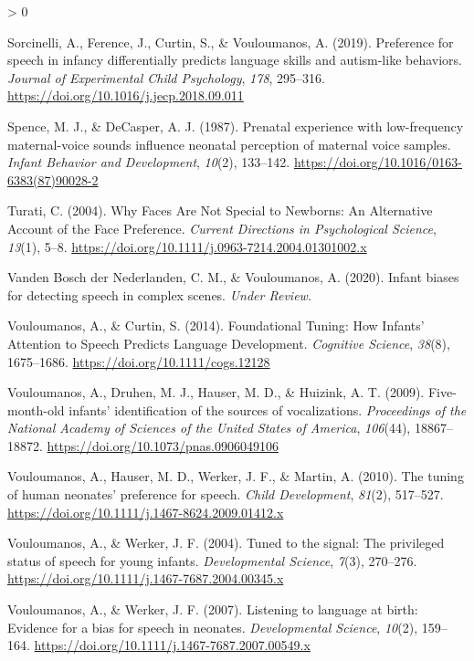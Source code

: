 \documentclass[
  english,
  man]{apa6}
\newlength{\cslhangindent}
\newenvironment{CSLReferences}[2] %
 {%
  \setlength{\parindent}{0pt}
  \ifodd #1 \everypar{\setlength{\hangindent}{\cslhangindent}}\ignorespaces\fi
  \ifnum #2 > 0
  \setlength{\parskip}{#2\baselineskip}
  \fi
 }%
 {}
\begin{document}
\begin{CSLReferences}{1}{0}
\leavevmode\hypertarget{ref-sorcinelli_preference_2019}{}%
Sorcinelli, A., Ference, J., Curtin, S., \& Vouloumanos, A. (2019). Preference for speech in infancy differentially predicts language skills and autism-like behaviors. \emph{Journal of Experimental Child Psychology}, \emph{178}, 295--316. \url{https://doi.org/10.1016/j.jecp.2018.09.011}

\leavevmode\hypertarget{ref-spence_prenatal_1987}{}%
Spence, M. J., \& DeCasper, A. J. (1987). Prenatal experience with low-frequency maternal-voice sounds influence neonatal perception of maternal voice samples. \emph{Infant Behavior and Development}, \emph{10}(2), 133--142. \url{https://doi.org/10.1016/0163-6383(87)90028-2}

\leavevmode\hypertarget{ref-turati_why_2004}{}%
Turati, C. (2004). Why {Faces} {Are} {Not} {Special} to {Newborns}: {An} {Alternative} {Account} of the {Face} {Preference}. \emph{Current Directions in Psychological Science}, \emph{13}(1), 5--8. \url{https://doi.org/10.1111/j.0963-7214.2004.01301002.x}

\leavevmode\hypertarget{ref-vanden_bosch_der_nederlanden_infant_2020}{}%
Vanden Bosch der Nederlanden, C. M., \& Vouloumanos, A. (2020). Infant biases for detecting speech in complex scenes. \emph{Under Review}.

\leavevmode\hypertarget{ref-vouloumanos_foundational_2014}{}%
Vouloumanos, A., \& Curtin, S. (2014). Foundational {Tuning}: {How} {Infants}' {Attention} to {Speech} {Predicts} {Language} {Development}. \emph{Cognitive Science}, \emph{38}(8), 1675--1686. \url{https://doi.org/10.1111/cogs.12128}

\leavevmode\hypertarget{ref-vouloumanos_five-month-old_2009}{}%
Vouloumanos, A., Druhen, M. J., Hauser, M. D., \& Huizink, A. T. (2009). Five-month-old infants' identification of the sources of vocalizations. \emph{Proceedings of the National Academy of Sciences of the United States of America}, \emph{106}(44), 18867--18872. \url{https://doi.org/10.1073/pnas.0906049106}

\leavevmode\hypertarget{ref-vouloumanos_tuning_2010}{}%
Vouloumanos, A., Hauser, M. D., Werker, J. F., \& Martin, A. (2010). The tuning of human neonates' preference for speech. \emph{Child Development}, \emph{81}(2), 517--527. \url{https://doi.org/10.1111/j.1467-8624.2009.01412.x}

\leavevmode\hypertarget{ref-vouloumanos_tuned_2004}{}%
Vouloumanos, A., \& Werker, J. F. (2004). Tuned to the signal: The privileged status of speech for young infants. \emph{Developmental Science}, \emph{7}(3), 270--276. \url{https://doi.org/10.1111/j.1467-7687.2004.00345.x}

\leavevmode\hypertarget{ref-vouloumanos_listening_2007}{}%
Vouloumanos, A., \& Werker, J. F. (2007). Listening to language at birth: Evidence for a bias for speech in neonates. \emph{Developmental Science}, \emph{10}(2), 159--164. \url{https://doi.org/10.1111/j.1467-7687.2007.00549.x}

\end{CSLReferences}

\endgroup
\end{document}
